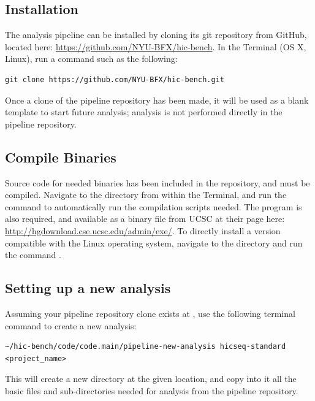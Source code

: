 \subsection{Installation}\label{Intro:installation}%
The analysis pipeline can be installed by cloning its git repository from GitHub, located here:
\url{https://github.com/NYU-BFX/hic-bench}.
In the Terminal (OS X, Linux), run a command such as the following:
\begin{lstlisting}
git clone https://github.com/NYU-BFX/hic-bench.git
\end{lstlisting}

Once a clone of the pipeline repository has been made, it will be used as a blank template to start future analysis; analysis is not performed directly in the pipeline repository. 
\subsection{Compile Binaries}\label{Intro:compile}
Source code for needed binaries has been included in the repository, and must be compiled. Navigate to the  directory from within the Terminal, and run the command  to automatically run the compilation scripts needed. The program  is also required, and available as a binary file from UCSC at their page here: \url{http://hgdownload.cse.ucsc.edu/admin/exe/}. To directly install a version compatible with the Linux operating system, navigate to the  directory and run the command .
\subsection{Setting up a new analysis}\label{Intro:setup-new-analysis}
Assuming your pipeline repository clone exists at , use the following terminal command to create a new analysis:
\begin{lstlisting}
~/hic-bench/code/code.main/pipeline-new-analysis hicseq-standard <project_name>
\end{lstlisting}
This will create a new directory at the given location, and copy into it all the basic files and sub-directories needed for analysis from the pipeline repository. 
